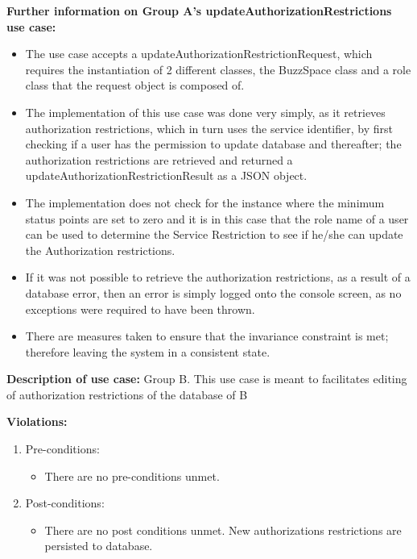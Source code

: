 \textbf{Further information on Group A's updateAuthorizationRestrictions
 use case:}
\begin{itemize}
	\item The use case accepts a updateAuthorizationRestrictionRequest, which requires the instantiation of 2 different classes, the BuzzSpace class and a role class that the request object is composed of.

\item The implementation of this use case was done very simply, as it retrieves authorization restrictions, which in turn uses the service identifier,  by first checking if a user has the permission to update database and thereafter; the authorization restrictions are retrieved and returned a updateAuthorizationRestrictionResult as a JSON object.

\item The implementation does not check for the instance where the minimum status points are set to zero and it is in this case that the role name of a user can be used to determine the Service Restriction to see if he/she can update the Authorization restrictions.

\item If it was not possible to retrieve the authorization restrictions, as a result of a database error, then an error is simply logged onto the console screen, as no exceptions were required to have been thrown.

\item There are measures taken to ensure that the invariance constraint is met; therefore leaving the system in a consistent state.

\end{itemize}

\textbf{Description of use case:}\newline
Group B.
This use case is meant to facilitates editing of authorization restrictions of the database of B
\medskip

\textbf{Violations:}
\begin{enumerate}

	\item Pre-conditions:
	\begin{itemize}
		\item There are no pre-conditions unmet. 
	\end{itemize}
	
	\item Post-conditions:
	\begin{itemize}
		\item There are no post conditions unmet. New authorizations restrictions are persisted to database.
	\end{itemize}
		
\end{enumerate}

